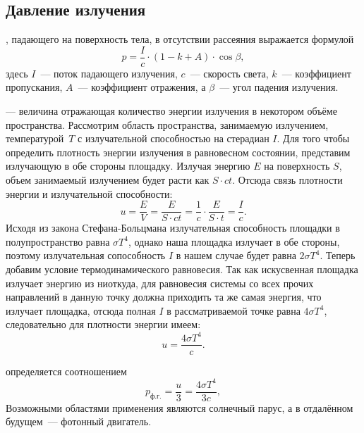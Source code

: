 \subsection{Давление излучения}
, падающего на поверхность тела, в отсутствии рассеяния выражается формулой
\begin{equation}
    p = \frac{I}{c} \cdot (1 - k + A) \cdot \cos \beta,
\end{equation}
здесь $I$~--- поток падающего излучения, $c$~--- скорость света, $k$~--- коэффициент пропускания, $A$~--- коэффициент отражения, а $\beta$~--- угол падения излучения.

 — величина отражающая количество энергии излучения в некотором объёме пространства. Рассмотрим область пространства, занимаемую излучением, температурой~$T$ с излучательной способностью на стерадиан $I$. Для того чтобы определить плотность энергии излучения в равновесном состоянии, представим излучающую в обе стороны площадку. Излучая энергию $E$ на поверхность $S$, объем занимаемый излучением будет расти как $S\cdot ct$. Отсюда связь плотности энергии и излучательной способности:
\begin{equation*}
	u = \frac{E}{V} = \frac{E}{S \cdot ct} = \frac{1}{c} \cdot \frac{E}{S\cdot t} = \frac{I}{c}.
\end{equation*}
Исходя из закона Стефана-Больцмана излучательная способность площадки в полупространство равна $\sigma T^4$, однако наша площадка излучает в обе стороны, поэтому излучательная сопособность $I$ в нашем случае будет равна $2 \sigma T^4$. Теперь добавим условие термодинамического равновесия. Так как искусвенная площадка излучает энергию из ниоткуда, для равновесия системы со всех прочих направлений в данную точку должна приходить та же самая энергия, что излучает площадка, отсюда полная $I$ в рассматриваемой точке равна $4 \sigma T^4$, следовательно для плотности энергии имеем:
\begin{equation}
	u = \frac{4\sigma T^4}{c}.
\end{equation}

 определяется соотношением
\begin{equation}
    p_\text{ф.г.} = \frac{u}{3} = \frac{4 \sigma T^4}{3c},
\end{equation}
Возможными областями применения являются солнечный парус, а в отдалённом будущем~--- фотонный двигатель.
